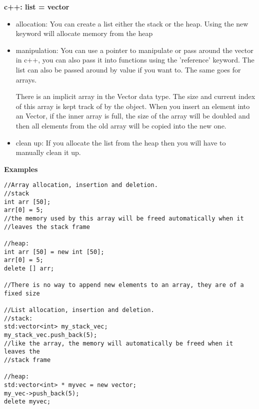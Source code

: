 \documentclass[11pt]{article}
\begin{document}
\textbf{c++: list = vector}
\begin{itemize}
    \item allocation:
        You can create a list either the stack or the heap.
        Using the new keyword will allocate memory from the heap

    \item manipulation:
        You can use a pointer to manipulate or pass around the vector in c++,
        you can also pass it into functions using the 'reference' keyword. The
        list can also be passed around by value if you want to.  The same goes
        for arrays.


        There is an implicit array in the Vector data type.  The size and
        current index of this array is kept track of by the object.  When you
        insert an element into an Vector, if the inner array is full, the
        size of the array will be doubled and then all elements from the old
        array will be copied into the new one.



    \item clean up:
        If you allocate the list from the heap then you will have to manually
        clean it up.

\end{itemize}


\textbf{Examples}
\begin{lstlisting}[style=MyC++]
//Array allocation, insertion and deletion.
//stack
int arr [50];
arr[0] = 5;
//the memory used by this array will be freed automatically when it
//leaves the stack frame

//heap:
int arr [50] = new int [50];
arr[0] = 5;
delete [] arr;

//There is no way to append new elements to an array, they are of a fixed size

//List allocation, insertion and deletion.
//stack:
std:vector<int> my_stack_vec;
my_stack_vec.push_back(5);
//like the array, the memory will automatically be freed when it leaves the
//stack frame

//heap:
std:vector<int> * myvec = new vector;
my_vec->push_back(5);
delete myvec;
\end{lstlisting}
\end{document}
